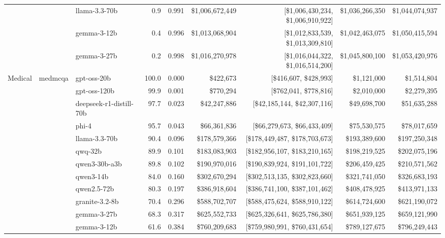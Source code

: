 \begin{table}[t]
\begin{tabular}{lllrrrrrr}
   &  & llama-3.3-70b & 0.9 & 0.991 & \$1,006,672,449 & [\$1,006,430,234, \$1,006,910,922] & \$1,036,266,350 & \$1,044,074,937 \\
   &  & gemma-3-12b & 0.4 & 0.996 & \$1,013,068,904 & [\$1,012,833,539, \$1,013,309,810] & \$1,042,463,075 & \$1,050,415,594 \\
   &  & gemma-3-27b & 0.2 & 0.998 & \$1,016,270,978 & [\$1,016,044,322, \$1,016,514,200] & \$1,045,800,100 & \$1,053,420,976 \\
\midrule
  Medical & medmcqa & gpt-oss-20b & 100.0 & 0.000 & \$422,673 & [\$416,607, \$428,993] & \$1,121,000 & \$1,514,804 \\
   &  & gpt-oss-120b & 99.9 & 0.001 & \$770,294 & [\$762,041, \$778,816] & \$2,010,000 & \$2,279,395 \\
   &  & deepseek-r1-distill-70b & 97.7 & 0.023 & \$42,247,886 & [\$42,185,144, \$42,307,116] & \$49,698,700 & \$51,635,288 \\
   &  & phi-4 & 95.7 & 0.043 & \$66,361,836 & [\$66,279,673, \$66,433,409] & \$75,530,575 & \$78,017,659 \\
   &  & llama-3.3-70b & 90.4 & 0.096 & \$178,579,366 & [\$178,449,487, \$178,703,673] & \$193,389,600 & \$197,250,348 \\
   &  & qwq-32b & 89.9 & 0.101 & \$183,083,903 & [\$182,956,107, \$183,210,165] & \$198,219,525 & \$202,075,196 \\
   &  & qwen3-30b-a3b & 89.8 & 0.102 & \$190,970,016 & [\$190,839,924, \$191,101,722] & \$206,459,425 & \$210,571,562 \\
   &  & qwen3-14b & 84.0 & 0.160 & \$302,670,294 & [\$302,513,135, \$302,823,660] & \$321,741,050 & \$326,683,193 \\
   &  & qwen2.5-72b & 80.3 & 0.197 & \$386,918,604 & [\$386,741,100, \$387,101,462] & \$408,478,925 & \$413,971,133 \\
   &  & granite-3.2-8b & 70.4 & 0.296 & \$588,702,707 & [\$588,475,624, \$588,910,122] & \$614,724,600 & \$621,190,072 \\
   &  & gemma-3-27b & 68.3 & 0.317 & \$625,552,733 & [\$625,326,641, \$625,786,380] & \$651,939,125 & \$659,121,990 \\
   &  & gemma-3-12b & 61.6 & 0.384 & \$760,209,683 & [\$759,980,991, \$760,431,654] & \$789,127,675 & \$796,249,443 \\
\bottomrule
\end{tabular}
\end{table}